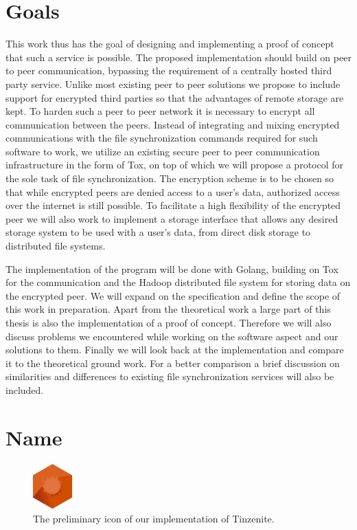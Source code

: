 \section{Goals}
\label{sec:Goals}

This work thus has the goal of designing and implementing a proof of concept that such a service is possible.
The proposed implementation should build on peer to peer communication, bypassing the requirement of a centrally hosted third party service.
Unlike most existing peer to peer solutions we propose to include support for encrypted third parties so that the advantages of remote storage are kept.
To harden such a peer to peer network it is necessary to encrypt all communication between the peers.
Instead of integrating and mixing encrypted communications with the file synchronization commands required for such software to work, we utilize an existing secure peer to peer communication infrastructure in the form of Tox, on top of which we will propose a protocol for the sole task of file synchronization.
The encryption scheme is to be chosen so that while encrypted peers are denied access to a user's data, authorized access over the internet is still possible.
To facilitate a high flexibility of the encrypted peer we will also work to implement a storage interface that allows any desired storage system to be used with a user's data, from direct disk storage to distributed file systems.

The implementation of the program will be done with Golang, building on Tox for the communication and the Hadoop distributed file system for storing data on the encrypted peer.
We will expand on the specification and define the scope of this work in preparation.
Apart from the theoretical work a large part of this thesis is also the implementation of a proof of concept.
Therefore we will also discuss problems we encountered while working on the software aspect and our solutions to them.
Finally we will look back at the implementation and compare it to the theoretical ground work.
For a better comparison a brief discussion on similarities and differences to existing file synchronization services will also be included.

\section{Name}
\label{sec:Name}

\begin{figure}[htp]
\centering
    \includegraphics[width=1.5cm]{img/icon}
\caption[Tinzenite Icon]{The preliminary icon of our implementation of Tinzenite.}
\label{fig:icon}
\end{figure}

